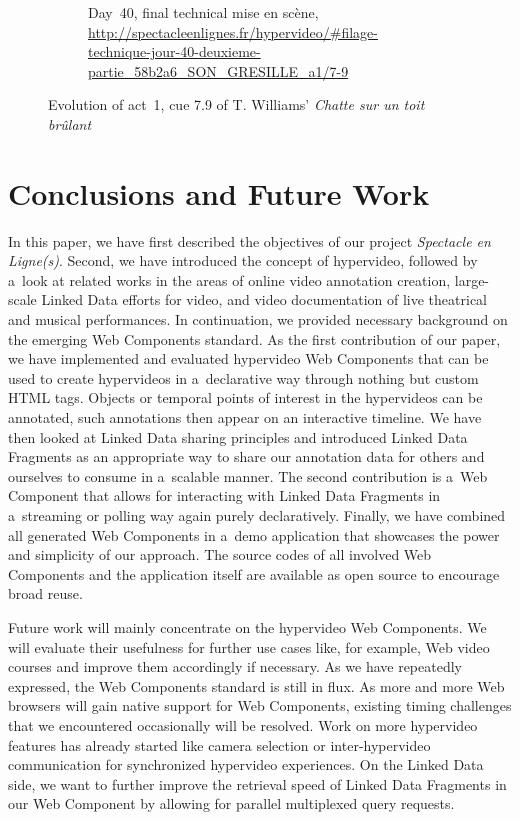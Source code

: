 \documentclass[runningheads,a4paper]{llncs}
\begin{document}
\begin{figure}
\begin{subfigure}[t]{0.32\textwidth}
                \caption{Day~40, final technical mise en scène,
                	\url{http://spectacleenlignes.fr/hypervideo/\#filage-technique-jour-40-deuxieme-partie_58b2a6_SON_GRESILLE_a1/7-9}}
                \label{fig:day40}
        \end{subfigure}
        \caption{Evolution of act~1, cue 7.9 of T. Williams' \emph{Chatte sur un toit brûlant}}\label{fig:demoapp}
\end{figure}

\section{Conclusions and Future Work}

In this paper, we have first described the objectives of our project \emph{Spectacle en Ligne(s)}.
Second, we have introduced the concept of hypervideo, followed by a~look at related works
in the areas of online video annotation creation, large-scale Linked Data efforts for video,
and video documentation of live theatrical and musical performances.
In continuation, we provided necessary background on the emerging Web Components standard.
As the first contribution of our paper, we have implemented and evaluated hypervideo Web Components
that can be used to create hypervideos in a~declarative way through nothing but custom HTML tags.
Objects or temporal points of interest in the hypervideos can be annotated,
such annotations then appear on an interactive timeline.
We have then looked at Linked Data sharing principles and introduced Linked Data Fragments
as an appropriate way to share our annotation data for others
and ourselves to consume in a~scalable manner.
The second contribution is a~Web Component that allows for interacting with Linked Data Fragments
in a~streaming or polling way again purely declaratively.
Finally, we have combined all generated Web Components in a~demo application
that showcases the power and simplicity of our approach.
The source codes of all involved Web Components and the application itself
are available as open source to encourage broad reuse.

Future work will mainly concentrate on the hypervideo Web Components.
We will evaluate their usefulness for further use cases like,
for example, Web video courses and improve them accordingly if necessary.
As we have repeatedly expressed, the Web Components standard is still in flux.
As more and more Web browsers will gain native support for Web Components,
existing timing challenges that we encountered occasionally will be resolved.
Work on more hypervideo features has already started like camera selection
or inter-hypervideo communication for synchronized hypervideo experiences.
On the Linked Data side, we want to further improve the retrieval speed
of Linked Data Fragments in our Web Component by allowing for parallel multiplexed query requests.
\end{document}

